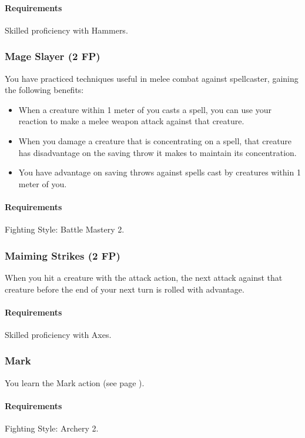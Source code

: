     \paragraph{Requirements} Skilled proficiency with Hammers.
\subsubsection{Mage Slayer (2 FP)} \label{feat::mageslayer}
    You have practiced techniques useful in melee combat against spellcaster, gaining the following benefits:
    \begin{itemize}
        \item When a creature within 1 meter of you casts a spell, you can use your reaction to make a melee weapon attack against that creature.
        \item When you damage a creature that is concentrating on a spell, that creature has disadvantage on the saving throw it makes to maintain its concentration.
        \item You have advantage on saving throws against spells cast by creatures within 1 meter of you.
    \end{itemize}
    \paragraph{Requirements} Fighting Style: Battle Mastery 2.
\subsubsection{Maiming Strikes (2 FP)} \label{feat::maimingstrikes}
    When you hit a creature with the attack action, the next attack against that creature before the end of your next turn is rolled with advantage.
    \paragraph{Requirements} Skilled proficiency with Axes.
\subsubsection{Mark} \label{feat::mark}
    You learn the Mark action (see page \pageref{act::mark}).
    \paragraph{Requirements} Fighting Style: Archery 2.
